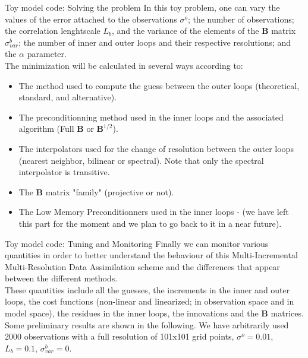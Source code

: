 \documentclass[8pt]{beamer}
\begin{document}
\begin{frame}{Toy model code: Solving the problem}
 In this toy problem, one can vary the values of the error attached to the observations $\sigma^o$; the number of observations; the correlation lenghtscale $L_b$, and the variance of the elements of the $\mathbf{B}$ matrix $\sigma^b_{var}$; the number of inner and outer loops and their respective resolutions; and the $\alpha$ parameter.\\
 \vspace{+0.5cm}
The minimization will be calculated in several ways according to:
\begin{itemize}
 \item The method used to compute the guess between the outer loops (theoretical, standard, and alternative).
 \item The preconditionning method used in the inner loops and the associated algorithm (Full $\mathbf{B}$ or $\mathbf{B}^{1/2}$).
 \item The interpolators used for the change of resolution between the outer loops (nearest neighbor, bilinear or spectral). Note that only the spectral interpolator is transitive.
 \item The $\mathbf{B}$ matrix "family" (projective or not).
 \item The Low Memory Preconditionners used in the inner loops - (we have left this part for the moment and we plan to go back to it in a near future).
\end{itemize}
\end{frame}

\begin{frame}{Toy model code: Tuning and Monitoring}
 Finally we can monitor various quantities in order to better understand the behaviour of this Multi-Incremental Multi-Resolution Data Assimilation scheme and the differences that appear between the different methods.\\
 \vspace{+0.3cm}
These quantities include all the guesses, the increments in the inner and outer loops, the cost functions (non-linear and linearized; in observation space and in model space), the residues in the inner loops, the innovations and the $\mathbf{B}$ matrices.\\
\vspace{+0.5cm}
Some preliminary results are shown in the following. We have arbitrarily used 2000 observations with a full resolution of 101x101 grid points, $\sigma^o=0.01$, $L_b=0.1$, $\sigma^b_{var}=0$.
\end{frame}
\end{document}
